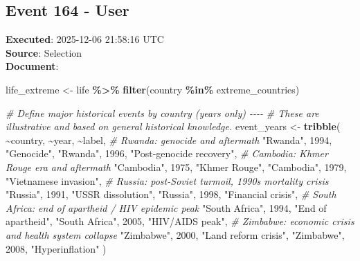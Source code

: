 \documentclass[
  11pt,
]{article}
\newenvironment{Shaded}{\begin{snugshade}}{\end{snugshade}}
\newcommand{\CommentTok}[1]{\textcolor[rgb]{0.56,0.35,0.01}{\textit{#1}}}
\newcommand{\DecValTok}[1]{\textcolor[rgb]{0.00,0.00,0.81}{#1}}
\newcommand{\FunctionTok}[1]{\textcolor[rgb]{0.13,0.29,0.53}{\textbf{#1}}}
\newcommand{\NormalTok}[1]{#1}
\newcommand{\OtherTok}[1]{\textcolor[rgb]{0.56,0.35,0.01}{#1}}
\newcommand{\SpecialCharTok}[1]{\textcolor[rgb]{0.81,0.36,0.00}{\textbf{#1}}}
\newcommand{\StringTok}[1]{\textcolor[rgb]{0.31,0.60,0.02}{#1}}
\begin{document}
\subsection{Event 164 - User}\label{event-164---user}

\textbf{Executed}: 2025-12-06 21:58:16 UTC\\
\textbf{Source}: Selection\\
\textbf{Document}:

\begin{Shaded}
\begin{Highlighting}[]
\NormalTok{life\_extreme }\OtherTok{\textless{}{-}}\NormalTok{ life }\SpecialCharTok{\%\textgreater{}\%}
  \FunctionTok{filter}\NormalTok{(country }\SpecialCharTok{\%in\%}\NormalTok{ extreme\_countries)}

\CommentTok{\# Define major historical events by country (years only) {-}{-}{-}{-}}
\CommentTok{\# These are illustrative and based on general historical knowledge.}
\NormalTok{event\_years }\OtherTok{\textless{}{-}} \FunctionTok{tribble}\NormalTok{(}
  \SpecialCharTok{\textasciitilde{}}\NormalTok{country,                }\SpecialCharTok{\textasciitilde{}}\NormalTok{year, }\SpecialCharTok{\textasciitilde{}}\NormalTok{label,}
  \CommentTok{\# Rwanda: genocide and aftermath}
  \StringTok{"Rwanda"}\NormalTok{,                }\DecValTok{1994}\NormalTok{,  }\StringTok{"Genocide"}\NormalTok{,}
  \StringTok{"Rwanda"}\NormalTok{,                }\DecValTok{1996}\NormalTok{,  }\StringTok{"Post{-}genocide recovery"}\NormalTok{,}
  \CommentTok{\# Cambodia: Khmer Rouge era and aftermath}
  \StringTok{"Cambodia"}\NormalTok{,              }\DecValTok{1975}\NormalTok{,  }\StringTok{"Khmer Rouge"}\NormalTok{,}
  \StringTok{"Cambodia"}\NormalTok{,              }\DecValTok{1979}\NormalTok{,  }\StringTok{"Vietnamese invasion"}\NormalTok{,}
  \CommentTok{\# Russia: post{-}Soviet turmoil, 1990s mortality crisis}
  \StringTok{"Russia"}\NormalTok{,                }\DecValTok{1991}\NormalTok{,  }\StringTok{"USSR dissolution"}\NormalTok{,}
  \StringTok{"Russia"}\NormalTok{,                }\DecValTok{1998}\NormalTok{,  }\StringTok{"Financial crisis"}\NormalTok{,}
  \CommentTok{\# South Africa: end of apartheid / HIV epidemic peak}
  \StringTok{"South Africa"}\NormalTok{,          }\DecValTok{1994}\NormalTok{,  }\StringTok{"End of apartheid"}\NormalTok{,}
  \StringTok{"South Africa"}\NormalTok{,          }\DecValTok{2005}\NormalTok{,  }\StringTok{"HIV/AIDS peak"}\NormalTok{,}
  \CommentTok{\# Zimbabwe: economic crisis and health system collapse}
  \StringTok{"Zimbabwe"}\NormalTok{,              }\DecValTok{2000}\NormalTok{,  }\StringTok{"Land reform crisis"}\NormalTok{,}
  \StringTok{"Zimbabwe"}\NormalTok{,              }\DecValTok{2008}\NormalTok{,  }\StringTok{"Hyperinflation"}
\NormalTok{)}
\end{Highlighting}
\end{Shaded}
\end{document}
